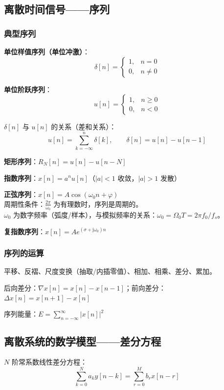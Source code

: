\documentclass[11pt,a4paper]{ctexart}
\newcommand{\jj}{\mathrm{j}}            %
\newcommand{\dirac}{\delta}             %
\begin{document}
\subsection{离散时间信号——序列}

\subsubsection{典型序列}

\textbf{单位样值序列（单位冲激）}：
\[
\dirac[n] = \begin{cases} 1, & n = 0 \\ 0, & n \neq 0 \end{cases}
\]

\textbf{单位阶跃序列}：
\[
u[n] = \begin{cases} 1, & n \ge 0 \\ 0, & n < 0 \end{cases}
\]

$\dirac[n]$ 与 $u[n]$ 的关系（差和关系）：
\[
u[n] = \sum_{k=-\infty}^{n} \dirac[k],\qquad \dirac[n] = u[n] - u[n-1]
\]

\textbf{矩形序列}：$R_N[n] = u[n] - u[n-N]$

\textbf{指数序列}：$x[n] = a^n u[n]$（$|a| < 1$ 收敛，$|a| > 1$ 发散）

\textbf{正弦序列}：$x[n] = A\cos(\omega_0 n + \varphi)$\\
周期性条件：$\frac{2\pi}{\omega_0}$ 为有理数时，序列是周期的。\\
$\omega_0$ 为数字频率（弧度/样本），与模拟频率的关系：$\omega_0 = \Omega_0 T = 2\pi f_0/f_s$。

\textbf{复指数序列}：$x[n] = Ae^{(\sigma + \jj\omega_0)n}$

\subsubsection{序列的运算}
平移、反褶、尺度变换（抽取/内插零值）、相加、相乘、差分、累加。

后向差分：$\nabla x[n] = x[n] - x[n-1]$；前向差分：$\Delta x[n] = x[n+1] - x[n]$

序列能量：$E = \sum_{n=-\infty}^{\infty} |x[n]|^2$

\subsection{离散系统的数学模型——差分方程}

$N$ 阶常系数线性差分方程：
\[
\sum_{k=0}^{N} a_k y[n-k] = \sum_{r=0}^{M} b_r x[n-r]
\]
\end{document}
